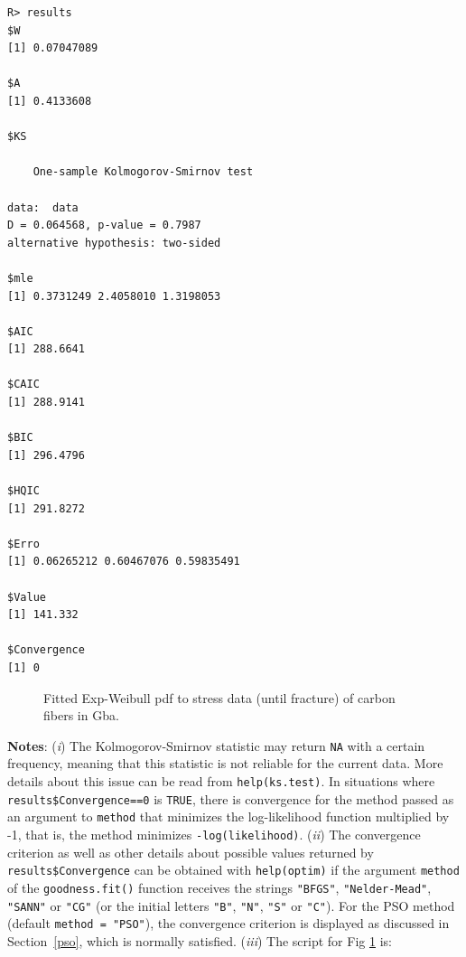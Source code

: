 \documentclass[10pt,letterpaper]{article}
\begin{document}
\begin{verbatim}
R> results
$W
[1] 0.07047089
		
$A
[1] 0.4133608
		
$KS
		
	One-sample Kolmogorov-Smirnov test
		
data:  data
D = 0.064568, p-value = 0.7987
alternative hypothesis: two-sided
		
$mle
[1] 0.3731249 2.4058010 1.3198053
		
$AIC
[1] 288.6641
		
$CAIC
[1] 288.9141
		
$BIC
[1] 296.4796
		
$HQIC
[1] 291.8272
		
$Erro
[1] 0.06265212 0.60467076 0.59835491
		
$Value
[1] 141.332
		
$Convergence
[1] 0
\end{verbatim}

\begin{figure}[H]
\centering
\caption{Fitted Exp-Weibull pdf to stress data (until fracture) of carbon fibers in Gba.}
\label{plot_ajustament}
\end{figure}


\hspace{-0.6cm}

\textbf{Notes}: ({\it i}) The Kolmogorov-Smirnov statistic may return \texttt{NA} with a certain frequency,
meaning  that this statistic is not reliable for the current data.
More details about this issue can be read from \texttt{help(ks.test)}.
In situations where \texttt{results\$Convergence==0} is \texttt{TRUE}, there is convergence for the method passed as an argument
to \texttt{method} that minimizes the log-likelihood function multiplied by -1, that is, the method minimizes \texttt{-log(likelihood)}.
({\it ii}) The convergence criterion as well as other details about possible values returned by \texttt{results\$Convergence}
can be obtained with \texttt{help(optim)} if the argument \texttt{method} of the \texttt{goodness.fit()} function receives
the strings \texttt{"BFGS"}, \texttt{"Nelder-Mead"}, \texttt{"SANN"} or \texttt{"CG"} (or the initial letters \texttt{"B"}, \texttt{"N"}, \texttt{"S"} or \texttt{"C"}).
For the PSO method  (default \texttt{method = "PSO"}), the convergence criterion is displayed as discussed in Section~\ref{pso}, which is normally  satisfied.
({\it iii}) The script for Fig \ref{plot_ajustament} is:
\end{document}
